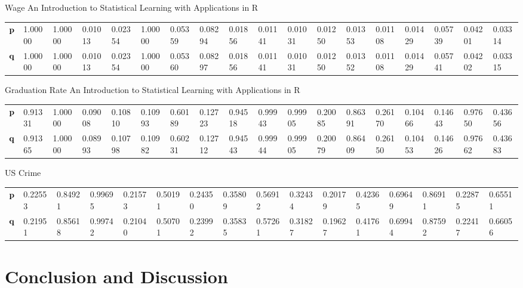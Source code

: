 \documentclass{amsart}[12pt]
\begin{document}
Wage
An Introduction to Statistical Learning with Applications in R

\begin{tabular}{llllllllllllllllll}
${\bf p}$ & 1.00000&1.00000&0.01013&0.02354&1.00000&0.05359&0.08294&0.01856&0.01141&0.01031&0.01250&0.01353&0.01108&0.01429&0.05739&0.04201&0.03314\\
${\bf q}$ & 1.00000&1.00000&0.01013&0.02354&1.00000&0.05360&0.08297&0.01856&0.01141&0.01031&0.01250&0.01352&0.01108&0.01429&0.05741&0.04202&0.03315\\
\end{tabular}

Graduation Rate
An Introduction to Statistical Learning with Applications in R

\begin{tabular}{llllllllllllllllll}
${\bf p}$ & 0.91331&1.00000&0.09008&0.10810&0.10993&0.60189&0.12723&0.94518&0.99943&0.99905&0.20085&0.86391&0.26170&0.10466&0.14643&0.97650&0.43656\\
${\bf q}$ & 0.91365&1.00000&0.08993&0.10798&0.10982&0.60231&0.12712&0.94543&0.99944&0.99905&0.20079&0.86409&0.26150&0.10453&0.14626&0.97662&0.43683\\
\end{tabular}

US Crime

\begin{tabular}{llllllllllllllll}
${\bf p}$ & 0.22553&0.84921&0.99695&0.21573&0.50191&0.24350&0.35809&0.56912&0.32434&0.20179&0.42365&0.69649&0.86911&0.22875&0.65511\\
${\bf q}$ & 0.21951&0.85618&0.99742&0.21040&0.50701&0.23992&0.35835&0.57261&0.31827&0.19627&0.41761&0.69944&0.87592&0.22417&0.66056\\
\end{tabular}

\section{Conclusion and Discussion}
\label{sec:conclusion}



\end{document}
